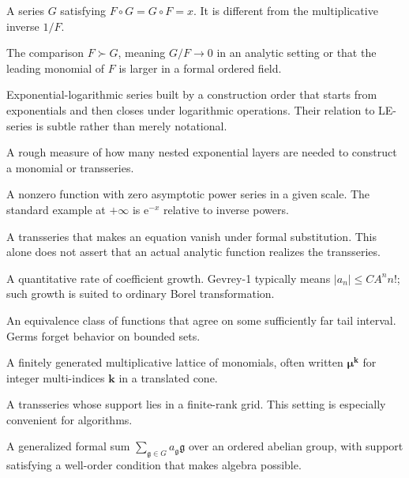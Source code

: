 \documentclass[11pt,openany]{book}
\theoremstyle{plain}
\theoremstyle{definition}
\theoremstyle{remark}
\newcommand{\g}{\mathfrak{g}}
\newcommand{\e}{\mathrm{e}}
\begin{document}
\begin{description}[style=nextline,itemsep=0.75em]
\item[Compositional inverse]
A series $G$ satisfying $F\circ G=G\circ F=x$. It is different from the multiplicative inverse $1/F$.

\item[Dominance]
The comparison $F\succ G$, meaning $G/F\to0$ in an analytic setting or that the leading monomial of $F$ is larger in a formal ordered field.

\item[EL-series]
Exponential-logarithmic series built by a construction order that starts from exponentials and then closes under logarithmic operations. Their relation to LE-series is subtle rather than merely notational.

\item[Exponential height]
A rough measure of how many nested exponential layers are needed to construct a monomial or transseries.

\item[Flat function]
A nonzero function with zero asymptotic power series in a given scale. The standard example at $+\infty$ is $\e^{-x}$ relative to inverse powers.

\item[Formal solution]
A transseries that makes an equation vanish under formal substitution. This alone does not assert that an actual analytic function realizes the transseries.

\item[Gevrey order]
A quantitative rate of coefficient growth. Gevrey-1 typically means $|a_n|\le CA^n n!$; such growth is suited to ordinary Borel transformation.

\item[Germ at $+\infty$]
An equivalence class of functions that agree on some sufficiently far tail interval. Germs forget behavior on bounded sets.

\item[Grid]
A finitely generated multiplicative lattice of monomials, often written $\boldsymbol\mu^{\mathbf{k}}$ for integer multi-indices $\mathbf{k}$ in a translated cone.

\item[Grid-based transseries]
A transseries whose support lies in a finite-rank grid. This setting is especially convenient for algorithms.

\item[Hahn series]
A generalized formal sum $\sum_{\g\in G}a_\g\g$ over an ordered abelian group, with support satisfying a well-order condition that makes algebra possible.


\end{description}
\end{document}
